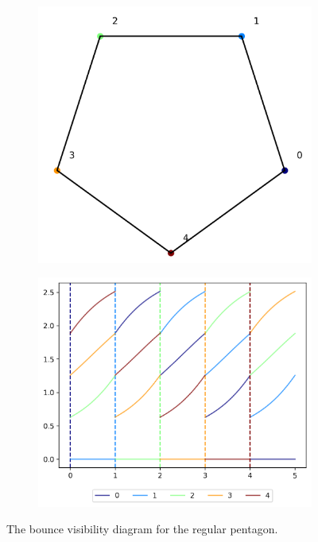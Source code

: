 \documentclass[]{styles/svproc}  %
\begin{document}
\begin{figure}
\begin{subfigure}{0.25\textwidth}
\centering
\includegraphics[width=0.5\linewidth]{figures/regular_pent.png}
\end{subfigure}%
\begin{subfigure}{0.25\textwidth}
\centering
\includegraphics[width=0.8\linewidth]{figures/regular_pent_bvd.png}
\end{subfigure}
\caption{The bounce visibility diagram for the regular pentagon. }
\label{fig:regular_pent_bvd}
\end{figure}
\end{document}
